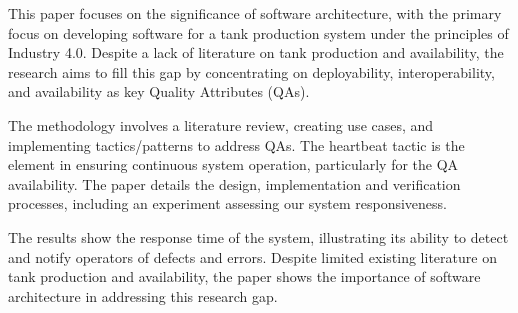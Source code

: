 

This paper focuses on the significance of software architecture, with the primary focus on developing software for a tank production system under the principles of Industry 4.0. Despite a lack of literature on tank production and availability, the research aims to fill this gap by concentrating on deployability, interoperability, and availability as key Quality Attributes (QAs). 

The methodology involves a literature review, creating use cases, and implementing tactics/patterns to address QAs. The heartbeat tactic is the element in ensuring continuous system operation, particularly for the QA availability. The paper details the design, implementation and verification processes, including an experiment assessing our system responsiveness. 

The results show the response time of the system, illustrating its ability to detect and notify operators of defects and errors. Despite limited existing literature on tank production and availability, the paper shows the importance of software architecture in addressing this research gap.
